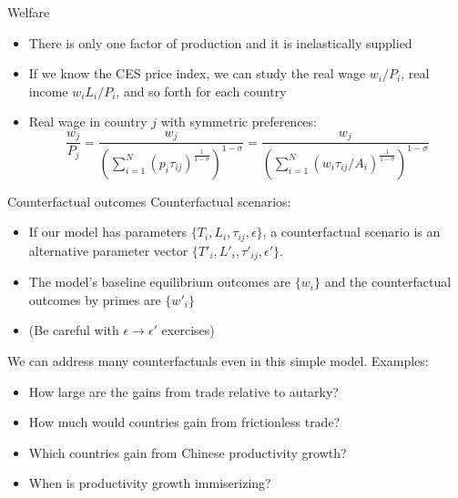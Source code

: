 \documentclass[10pt,notes=hide]{beamer}
\begin{document}
\begin{frame}{Welfare}
\begin{itemize}
\item There is only one factor of production and it is inelastically supplied
\item If we know the CES price index, we can study the real wage $w_i / P_i$, real income $w_i L_i / P_i$, and so forth for each country
\item Real wage in country $j$ with symmetric preferences:
$$
\frac{w_j}{P_{j}}
=
\frac{w_j}{\left(\sum_{i=1}^{N} \left(p_{i}\tau_{ij}\right)^{\frac{1}{1-\sigma}}\right)^{1-\sigma}}
=
\frac{w_j}{\left(\sum_{i=1}^{N} \left(w_i \tau_{ij} / A_i\right)^{\frac{1}{1-\sigma}}\right)^{1-\sigma}}
$$
\end{itemize}
\end{frame}
\begin{frame}{Counterfactual outcomes}
Counterfactual scenarios:
\begin{itemize}
\item If our model has parameters $\{T_i,L_i,\tau_{ij},\epsilon\}$,
a counterfactual scenario is an alternative parameter vector
$\{T'_i,L'_i,\tau'_{ij},\epsilon'\}$.
\item The model's baseline equilibrium outcomes are $\{w_{i}\}$
and the counterfactual outcomes by primes are $\{w'_{i}\}$
\item[] (Be careful with $\epsilon \to \epsilon'$ exercises)
\end{itemize}
We can address many counterfactuals even in this simple model. Examples:
\begin{itemize}
\item How large are the gains from trade relative to autarky?
\item How much would countries gain from frictionless trade?
\item Which countries gain from Chinese productivity growth?
\item When is productivity growth immiserizing?
\end{itemize}
\end{frame}
\end{document}

